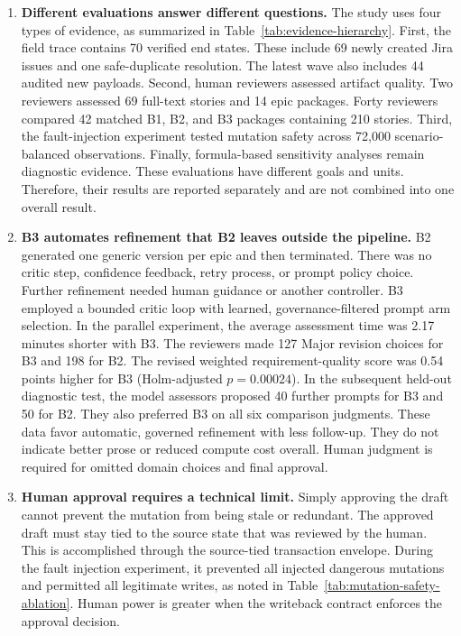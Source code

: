 \documentclass[pdflatex,sn-basic]{sn-jnl}
\begin{document}
\begin{enumerate}
  \item \textbf{Different evaluations answer different questions.} The study uses four types of evidence, as summarized in Table~\ref{tab:evidence-hierarchy}. First, the field trace contains 70 verified end states. These include 69 newly created Jira issues and one safe-duplicate resolution. The latest wave also includes 44 audited new payloads. Second, human reviewers assessed artifact quality. Two reviewers assessed 69 full-text stories and 14 epic packages. Forty reviewers compared 42 matched B1, B2, and B3 packages containing 210 stories. Third, the fault-injection experiment tested mutation safety across 72,000 scenario-balanced observations. Finally, formula-based sensitivity analyses remain diagnostic evidence. These evaluations have different goals and units. Therefore, their results are reported separately and are not combined into one overall result.

  \item \textbf{B3 automates refinement that B2 leaves outside the pipeline.} B2 generated one generic version per epic and then terminated. There was no critic step, confidence feedback, retry process, or prompt policy choice. Further refinement needed human guidance or another controller. B3 employed a bounded critic loop with learned, governance-filtered prompt arm selection. In the parallel experiment, the average assessment time was 2.17 minutes shorter with B3. The reviewers made 127 Major revision choices for B3 and 198 for B2. The revised weighted requirement-quality score was 0.54 points higher for B3 (Holm-adjusted $p=0.00024$). In the subsequent held-out diagnostic test, the model assessors proposed 40 further prompts for B3 and 50 for B2. They also preferred B3 on all six comparison judgments. These data favor automatic, governed refinement with less follow-up. They do not indicate better prose or reduced compute cost overall. Human judgment is required for omitted domain choices and final approval.

  \item \textbf{Human approval requires a technical limit.} Simply approving the draft cannot prevent the mutation from being stale or redundant. The approved draft must stay tied to the source state that was reviewed by the human. This is accomplished through the source-tied transaction envelope. During the fault injection experiment, it prevented all injected dangerous mutations and permitted all legitimate writes, as noted in Table~\ref{tab:mutation-safety-ablation}. Human power is greater when the writeback contract enforces the approval decision.


\end{enumerate}
\end{document}
